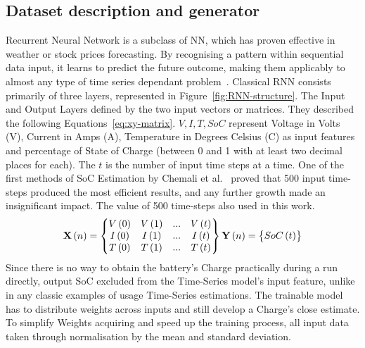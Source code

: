 \subsection{Dataset description and generator} \label{subsec:RNN}
Recurrent Neural Network is a subclass of NN, which has proven effective in weather or stock prices forecasting.
By recognising a pattern within sequential data input, it learns to predict the future outcome, making them applicably to almost any type of time series dependant problem~\cite{anton_battery_2013}.
Classical RNN consists primarily of three layers, represented in Figure~\ref{fig:RNN-structure}.
The Input and Output Layers defined by the two input vectors or matrices.
They described the following Equations~\ref{eq:xy-matrix}.
$V, I, T, SoC$ represent Voltage in Volts (V), Current in Amps (A), Temperature in Degrees Celsius (\textdegree{}C) as input features and percentage of State of Charge (between 0 and 1 with at least two decimal places for each).
The $t$ is the number of input time steps at a time. One of the first methods of SoC Estimation by Chemali et al.~\cite{Chemali2017} proved that 500 input time-steps produced the most efficient results, and any further growth made an insignificant impact.
The value of 500 time-steps also used in this work.
\begin{equation}
    \textbf{X} \left (n  \right ) = 
    \begin{Bmatrix}
        V \left (0  \right ) & V \left (1  \right ) & ... & V \left (t  \right )\\ 
        I \left (0  \right ) & I \left (1  \right ) & ... & I \left (t  \right )\\ 
        T \left (0  \right ) & T \left (1  \right ) & ... & T \left (t  \right )\\
    \end{Bmatrix}
    \\ \textbf{Y} \left (n  \right ) = 
    \begin{Bmatrix}
        SoC \left (t  \right ) 
    \end{Bmatrix}
\label{eq:xy-matrix}
\end{equation}
Since there is no way to obtain the battery's Charge practically during a run directly, output SoC excluded from the Time-Series model's input feature, unlike in any classic examples of usage Time-Series estimations.
The trainable model has to distribute weights across inputs and still develop a Charge's close estimate.
To simplify Weights acquiring and speed up the training process, all input data taken through normalisation by the mean and standard deviation.
